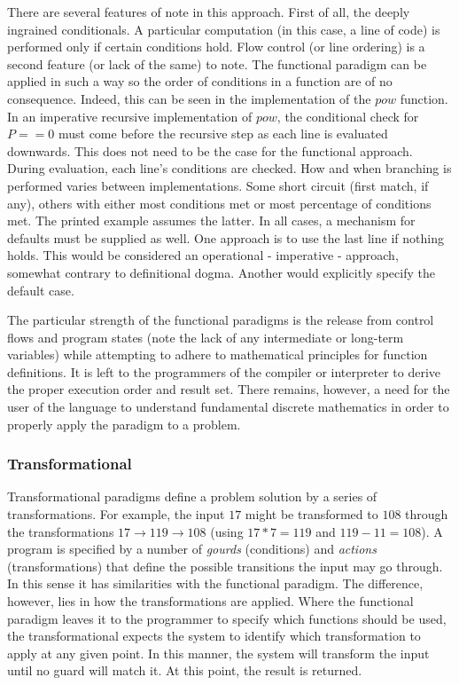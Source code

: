 There are several features of note in this approach. First of all, the deeply ingrained conditionals. A particular computation (in this case, a line of code) is performed only if certain conditions hold. Flow control (or line ordering) is a second feature (or lack of the same) to note. The functional paradigm can be applied in such a way so the order of conditions in a function are of no consequence. Indeed, this can be seen in the implementation of the $pow$ function. In an imperative recursive implementation of $pow$, the conditional check for $P==0$ must come before the recursive step as each line is evaluated downwards. This does not need to be the case for the functional approach. During evaluation, each line's conditions are checked. How and when branching is performed varies between implementations. Some short circuit (first match, if any), others with either most conditions met or most percentage of conditions met. The printed example assumes the latter. In all cases, a mechanism for defaults must be supplied as well. One approach is to use the last line if nothing holds. This would be considered an operational - imperative - approach, somewhat contrary to definitional dogma. Another would explicitly specify the default case.

The particular strength of the functional paradigms is the release from control flows and program states (note the lack of any intermediate or long-term variables) while attempting to adhere to mathematical principles for function definitions. It is left to the programmers of the compiler or interpreter to derive the proper execution order and result set. There remains, however, a need for the user of the language to understand fundamental discrete mathematics in order to properly apply the paradigm to a problem.

\subsubsection*{Transformational}
Transformational paradigms define a problem solution by a series of transformations. For example, the input $17$ might be transformed to $108$ through the transformations $17 \rightarrow 119 \rightarrow 108$ (using $17 * 7 = 119$ and $119 - 11 = 108$). A program is specified by a number of \emph{gourds} (conditions) and \emph{actions} (transformations) that define the possible transitions the input may go through. In this sense it has similarities with the functional paradigm. The difference, however, lies in how the transformations are applied. Where the functional paradigm leaves it to the programmer to specify which functions should be used, the transformational expects the system to identify which transformation to apply at any given point. In this manner, the system will transform the input until no guard will match it. At this point, the result is returned.

